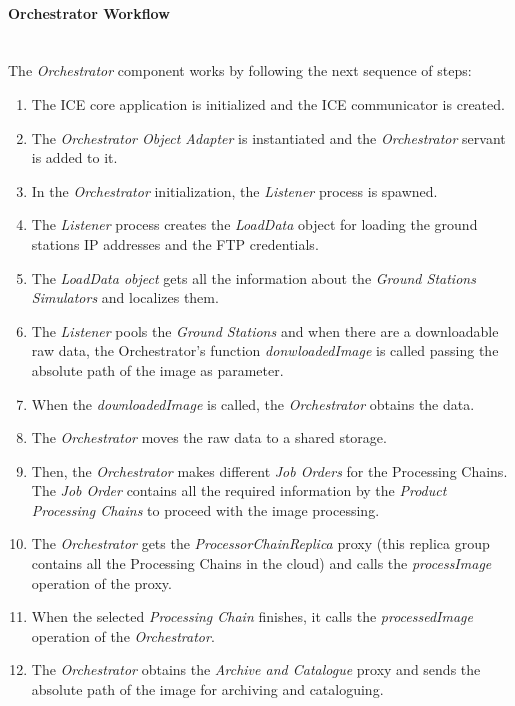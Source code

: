 \paragraph{Orchestrator Workflow}~\\

The \emph{Orchestrator} component works by following the next sequence of steps:
\begin{enumerate}
\item The ICE core application is initialized and the ICE communicator is
  created.
\item The \emph{Orchestrator Object Adapter} is instantiated and the \emph{Orchestrator} servant is
  added to it.
\item In the \emph{Orchestrator} initialization, the \emph{Listener} process is spawned.
\item The \emph{Listener} process creates the \emph{LoadData} object for loading the ground
  stations \ac{IP} addresses and the \ac{FTP} credentials.
\item The \emph{LoadData object} gets all the information about the \emph{Ground
    Stations Simulators} and localizes them.
\item The \emph{Listener} pools the \emph{Ground Stations} and when there are
  a downloadable raw data, the Orchestrator's function \emph{donwloadedImage} is
  called passing the absolute path of the image as parameter. 
\item  When the \emph{downloadedImage} is called, the \emph{Orchestrator}
  obtains the data.
\item  The \emph{Orchestrator} moves the raw data to a shared storage.
\item Then, the \emph{Orchestrator} makes different \emph{Job Orders} for the Processing Chains. The \emph{Job Order} contains all the required information by the \emph{Product Processing Chains} to proceed with the image processing.
\item The \emph{Orchestrator} gets the \emph{ProcessorChainReplica} proxy (this
  replica group contains all the Processing Chains in the cloud) and calls the
  \emph{processImage} operation of the proxy.
\item When the selected \emph{Processing Chain} finishes, it calls the \emph{processedImage}
  operation of the \emph{Orchestrator}.
\item The \emph{Orchestrator} obtains the \emph{Archive and Catalogue} proxy and
  sends the absolute path of the image for archiving and cataloguing.
\end{enumerate}

